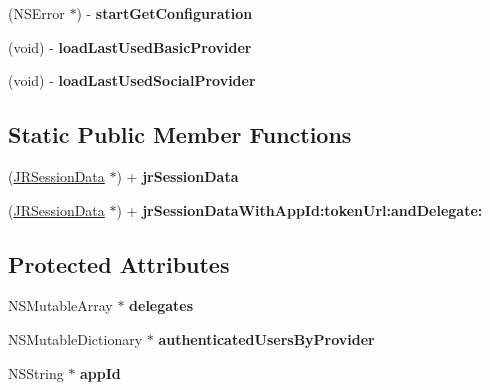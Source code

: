 \begin{DoxyCompactItemize}
\item 
\hypertarget{interface_j_r_session_data_a6cfcdbf422c9ec3ca1fe57c64093b3b2}{
(NSError $\ast$) -\/ {\bfseries startGetConfiguration}}
\label{interface_j_r_session_data_a6cfcdbf422c9ec3ca1fe57c64093b3b2}

\item 
\hypertarget{interface_j_r_session_data_a221ab8398819eb67a76bc4c252a6d0c1}{
(void) -\/ {\bfseries loadLastUsedBasicProvider}}
\label{interface_j_r_session_data_a221ab8398819eb67a76bc4c252a6d0c1}

\item 
\hypertarget{interface_j_r_session_data_a217e4a9a2566e0f6c142c637e79975dd}{
(void) -\/ {\bfseries loadLastUsedSocialProvider}}
\label{interface_j_r_session_data_a217e4a9a2566e0f6c142c637e79975dd}

\end{DoxyCompactItemize}
\subsection*{Static Public Member Functions}
\begin{DoxyCompactItemize}
\item 
\hypertarget{interface_j_r_session_data_a284cab0c7daed409087a69b7b6717568}{
(\hyperlink{interface_j_r_session_data}{JRSessionData} $\ast$) + {\bfseries jrSessionData}}
\label{interface_j_r_session_data_a284cab0c7daed409087a69b7b6717568}

\item 
\hypertarget{interface_j_r_session_data_a7f5aec64f71c53e2bcf740cf532708a1}{
(\hyperlink{interface_j_r_session_data}{JRSessionData} $\ast$) + {\bfseries jrSessionDataWithAppId:tokenUrl:andDelegate:}}
\label{interface_j_r_session_data_a7f5aec64f71c53e2bcf740cf532708a1}

\end{DoxyCompactItemize}
\subsection*{Protected Attributes}
\begin{DoxyCompactItemize}
\item 
\hypertarget{interface_j_r_session_data_a9c36787e6ec5a3091135ddba2b262441}{
NSMutableArray $\ast$ {\bfseries delegates}}
\label{interface_j_r_session_data_a9c36787e6ec5a3091135ddba2b262441}

\item 
\hypertarget{interface_j_r_session_data_aae5c96fb418167e7e95f3b8297f450c3}{
NSMutableDictionary $\ast$ {\bfseries authenticatedUsersByProvider}}
\label{interface_j_r_session_data_aae5c96fb418167e7e95f3b8297f450c3}

\item 
\hypertarget{interface_j_r_session_data_ad480f500efccf5796974f2fa5b271a1d}{
NSString $\ast$ {\bfseries appId}}
\label{interface_j_r_session_data_ad480f500efccf5796974f2fa5b271a1d}

\end{DoxyCompactItemize}

